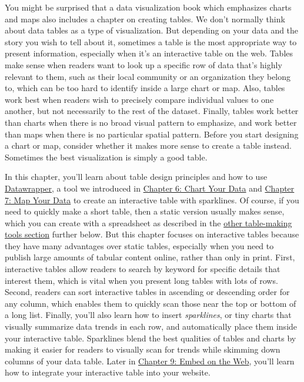 \documentclass[
  english,
]{book}
\begin{document}
You might be surprised that a data visualization book which emphasizes charts and maps also includes a chapter on creating tables. We don't normally think about data tables as a type of visualization. But depending on your data and the story you wish to tell about it, sometimes a table is the most appropriate way to present information, especially when it's an interactive table on the web. Tables make sense when readers want to look up a specific row of data that's highly relevant to them, such as their local community or an organization they belong to, which can be too hard to identify inside a large chart or map. Also, tables work best when readers wish to precisely compare individual values to one another, but not necessarily to the rest of the dataset. Finally, tables work better than charts when there is no broad visual pattern to emphasize, and work better than maps when there is no particular spatial pattern. Before you start designing a chart or map, consider whether it makes more sense to create a table instead. Sometimes the best visualization is simply a good table.

In this chapter, you'll learn about table design principles and how to use \href{https://www.datawrapper.de}{Datawrapper}, a tool we introduced in \href{chart.html}{Chapter 6: Chart Your Data} and \href{map.html}{Chapter 7: Map Your Data} to create an interactive table with sparklines. Of course, if you need to quickly make a short table, then a static version usually makes sense, which you can create with a spreadsheet as described in the \href{other-table-tools.html}{other table-making tools section} further below. But this chapter focuses on interactive tables because they have many advantages over static tables, especially when you need to publish large amounts of tabular content online, rather than only in print. First, interactive tables allow readers to search by keyword for specific details that interest them, which is vital when you present long tables with lots of rows. Second, readers can sort interactive tables in ascending or descending order for any column, which enables them to quickly scan those near the top or bottom of a long list. Finally, you'll also learn how to insert \emph{sparklines}, or tiny charts that visually summarize data trends in each row, and automatically place them inside your interactive table. Sparklines blend the best qualities of tables and charts by making it easier for readers to visually scan for trends while skimming down columns of your data table. Later in \href{embed.html}{Chapter 9: Embed on the Web}, you'll learn how to integrate your interactive table into your website.
\end{document}
